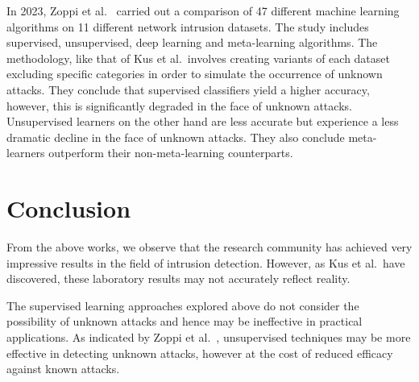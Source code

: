 In 2023, Zoppi et al.~\cite{Zoppi} carried out a comparison of 47 different
machine learning algorithms on 11 different network intrusion datasets. The
study includes supervised, unsupervised, deep learning and meta-learning
algorithms. The methodology, like that of Kus et al.\ involves creating
variants of each dataset excluding specific categories in order to simulate the
occurrence of unknown attacks. They conclude that supervised classifiers yield
a higher accuracy, however, this is significantly degraded in the face of
unknown attacks. Unsupervised learners on the other hand are less accurate but
experience a less dramatic decline in the face of unknown attacks. They also
conclude meta-learners outperform their non-meta-learning counterparts.

\section{Conclusion}%
\label{sec:conclusion}
From the above works, we observe that the research community has achieved
very impressive results in the field of intrusion detection. However, as Kus et
al.\ have discovered, these laboratory results may not accurately reflect
reality.

The supervised learning approaches explored above do not consider the
possibility of unknown attacks and hence may be ineffective in practical
applications. As indicated by Zoppi et al.~\cite{Zoppi}, unsupervised
techniques may be more effective in detecting unknown attacks, however at the
cost of reduced efficacy against known attacks.
